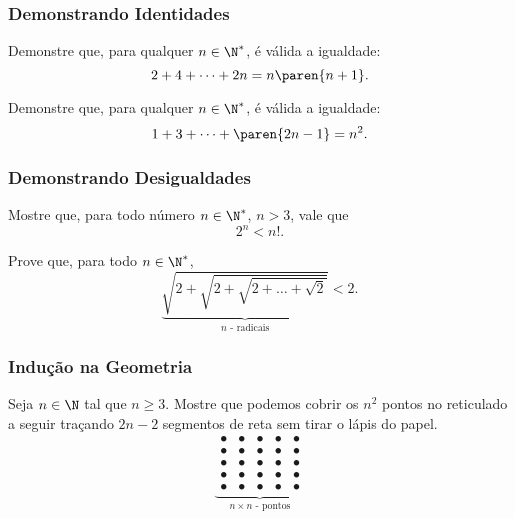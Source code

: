 \documentclass[brazil, notheorems, 10pt]{beamer}
\begin{document}

\begin{frame}
\frametitle{Demonstrando Identidades} %
\begin{Exem}
Demonstre que, para qualquer $n \in \N^\ast$, é válida a igualdade:
$$2+ 4+ \dots + 2n = n \paren {n+1}.$$
\end{Exem} \pause

\begin{Exem}
Demonstre que, para qualquer $n \in \N^\ast$, é válida a igualdade:
$$1+3+\dots +\paren {2n-1} = n^2.$$
\end{Exem}

\end{frame}




\begin{frame}
\frametitle{Demonstrando Desigualdades} %
\begin{Exem}
Mostre que, para todo número $n \in \N^\ast$, $n>3$, vale que
$$2^n < n!.$$
\end{Exem}\pause

\begin{Exem}
Prove  que, para todo $n \in \N^\ast$,
$$\underbrace{\sqrt{2+\sqrt{2+\sqrt{2+ \dots + \sqrt 2}}}}_{n  \text{ - radicais}} < 2.$$
\end{Exem}

\end{frame}



\begin{frame}
\frametitle{Indução na Geometria} %
\begin{Exem}
Seja $n \in \N$ tal que $n\geq 3$. Mostre  que podemos cobrir os
$n^2$ pontos no reticulado a seguir traçando $2n-2$ segmentos de
reta sem tirar o lápis do papel.
$$\underbrace{\begin{array}{ccccc}
								\bullet & \bullet & \bullet & \bullet & \bullet \\
								\bullet & \bullet & \bullet & \bullet & \bullet \\
								\bullet & \bullet & \bullet & \bullet & \bullet \\
								\bullet & \bullet & \bullet & \bullet & \bullet \\
								\bullet & \bullet & \bullet & \bullet & \bullet
							\end{array}
}_{n \times n \text{ - pontos}}$$
\end{Exem}


\end{frame}
\end{document}
